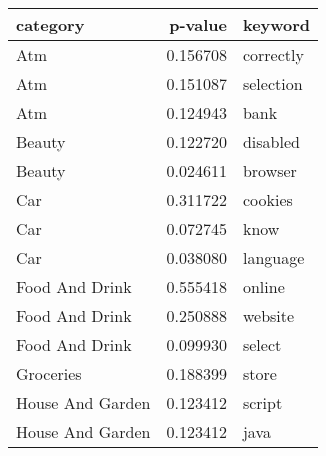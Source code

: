 \begin{tabular}{lrl}
\toprule
        category &  p-value &   keyword \\
\midrule
             Atm & 0.156708 & correctly \\
             Atm & 0.151087 & selection \\
             Atm & 0.124943 &      bank \\
          Beauty & 0.122720 &  disabled \\
          Beauty & 0.024611 &   browser \\
             Car & 0.311722 &   cookies \\
             Car & 0.072745 &      know \\
             Car & 0.038080 &  language \\
  Food And Drink & 0.555418 &    online \\
  Food And Drink & 0.250888 &   website \\
  Food And Drink & 0.099930 &    select \\
       Groceries & 0.188399 &     store \\
House And Garden & 0.123412 &    script \\
House And Garden & 0.123412 &      java \\
\bottomrule
\end{tabular}
